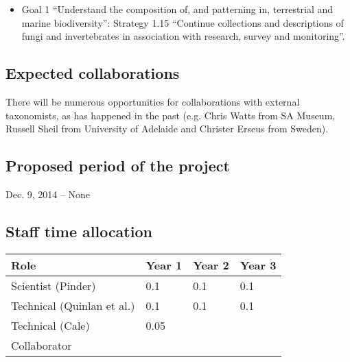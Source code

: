 \documentclass[version=last,
    paper=a4, %
    10pt, %
    usenames,
    dvipsnames,
    oneside, %
    headings=openany, %
    DIV=15 %
]{scrbook}
\begin{document}
\begin{itemize}
\itemsep1pt\parskip0pt
\item
  Goal 1 ``Understand the composition of, and patterning in, terrestrial
  and marine biodiversity'': Strategy 1.15 ``Continue collections and
  descriptions of fungi and invertebrates in association with research,
  survey and monitoring''.
\end{itemize}




\subsection*{Expected collaborations}

There will be numerous opportunities for collaborations with external
taxonomists, as has happened in the past (e.g. Chris Watts from SA
Museum, Russell Sheil from University of Adelaide and Christer Erseus
from Sweden).


\subsection*{Proposed period of the project}
Dec. 9, 2014 -- None



\subsection*{Staff time allocation }



\begin{longtabu} to \linewidth { |  X | X | X | X | }
\hline
{}
Role & Year 1 & Year 2 & Year 3\\
\hline
\endhead



Scientist (Pinder) & 0.1 & 0.1 & 0.1\\



Technical (Quinlan et al.) & 0.1 & 0.1 & 0.1\\



Technical (Cale) & 0.05 &  & \\



Collaborator &  &  & \\


\hline
\end{longtabu}
\end{document}
